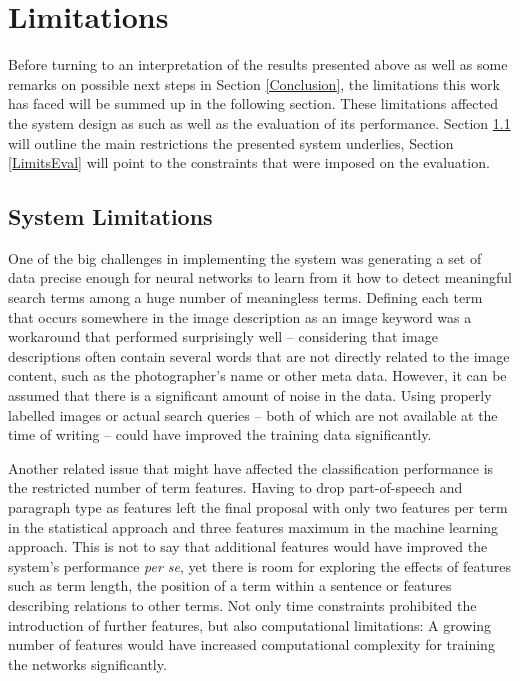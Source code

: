 \documentclass[11pt,a4paper,twoside]{article}
\begin{document}

\cleardoublepage

\section{Limitations} \label{Limits}

Before turning to an interpretation of the results presented above as well as some remarks on possible next steps in Section \ref{Conclusion}, the limitations this work has faced will be summed up in the following section. These limitations affected the system design as such as well as the evaluation of its performance. Section \ref{LimitsSystem} will outline the main restrictions the presented system underlies, Section \ref{LimitsEval} will point to the constraints that were imposed on the evaluation.

\subsection{System Limitations} \label{LimitsSystem}

One of the big challenges in implementing the system was generating a set of data precise enough for neural networks to learn from it how to detect meaningful search terms among a huge number of meaningless terms. Defining each term that occurs somewhere in the image description as an image keyword was a workaround that performed surprisingly well -- considering that image descriptions often contain several words that are not directly related to the image content, such as the photographer's name or other meta data. However, it can be assumed that there is a significant amount of noise in the data. Using properly labelled images or actual search queries -- both of which are not available at the time of writing -- could have improved the training data significantly.

Another related issue that might have affected the classification performance is the restricted number of term features. Having to drop part-of-speech and paragraph type as features left the final proposal with only two features per term in the statistical approach and three features maximum in the machine learning approach. This is not to say that additional features would have improved the system's performance \emph{per se}, yet there is room for exploring the effects of features such as term length, the position of a term within a sentence or features describing relations to other terms. Not only time constraints prohibited the introduction of further features, but also computational limitations: A growing number of features would have increased computational complexity for training the networks significantly.
\end{document}
